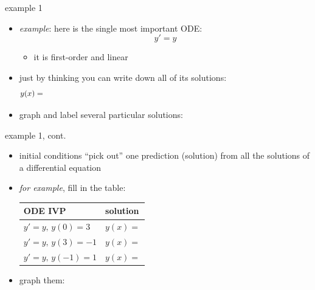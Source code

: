 \documentclass{beamer}
\begin{document}
\begin{frame}{example 1}

\begin{itemize}
\item \emph{example}: here is the single most important ODE:
    $$y' = y$$

\vspace{-4mm}
    \begin{itemize}
    \item it is first-order and linear
    \end{itemize}
\item just by thinking you can write down all of its solutions:
    $$y(x) = \hspace{5.0in}$$
\item graph and label several particular solutions:

\end{itemize}

\vfill
\end{frame}


\begin{frame}{example 1, cont.}

\begin{itemize}
\item initial conditions ``pick out'' one prediction (solution) from all the solutions of a differential equation
\item \emph{for example}, fill in the table:

\begin{tabular}{l|l}
ODE IVP & solution \phantom{sldafjdlkajf sd adsfkj asdf} \\ \hline
$y' = y, \, y(0)=3$ & $y(x)=$ \phantom{$\Big|$} \\ \hline
$y' = y, \, y(3)=-1$ & $y(x)=$ \phantom{$\Big|$} \\ \hline
$y' = y, \, y(-1)=1$ & $y(x)=$ \phantom{$\Big|$} \\ \hline
\end{tabular}

\smallskip
\item graph them:

\vspace{-5mm}
\end{itemize}

\vfill
\end{frame}
\end{document}

